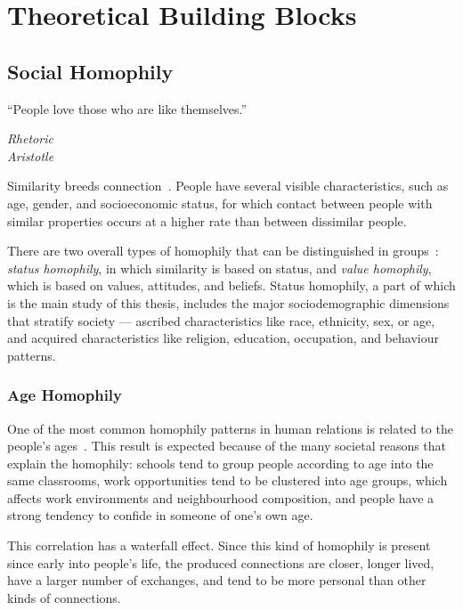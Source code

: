 
\chapter{Theoretical Building Blocks}
\label{chap:theoretical_intro}

\section{Social Homophily}

\epigraph{``People love those who are like themselves.''}{\textit{Rhetoric \\ Aristotle}}

Similarity breeds connection~\cite{mcpherson2001birds}. People have several visible characteristics, such as age, gender, and socioeconomic status, for which contact between people with similar properties occurs at a higher rate than between dissimilar people.

There are two overall types of homophily that can be distinguished in groups~\cite{lazarsfeld1954}: \textit{status homophily}, in which similarity is based on status, and \textit{value homophily}, which is based on values, attitudes, and beliefs. Status homophily, a part of which is the main study of this thesis, includes the major sociodemographic dimensions that stratify society --- ascribed characteristics like race, ethnicity, sex, or age, and acquired characteristics like religion, education, occupation, and behaviour patterns.

\subsection{Age Homophily}

One of the most common homophily patterns in human relations is related to the people's ages~\cite{ugander2011}\cite{mcpherson2001birds}. This result is expected because of the many societal reasons that explain the homophily: schools tend to group people according to age into the same classrooms, work opportunities tend to be clustered into age groups, which affects work environments and neighbourhood composition, and people have a strong tendency to confide in someone of one's own age.

This correlation has a waterfall effect. Since this kind of homophily is present since early into people's life, the produced connections are closer, longer lived, have a larger number of exchanges, and tend to be more personal than other kinds of connections.


